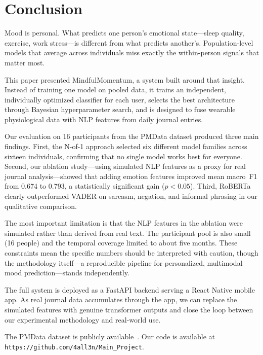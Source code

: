 \documentclass[conference]{IEEEtran}
\begin{document}
\section{Conclusion}
\label{sec:conclusion}

Mood is personal. What predicts one person's emotional state---sleep quality, exercise, work stress---is different from what predicts another's. Population-level models that average across individuals miss exactly the within-person signals that matter most.

This paper presented MindfulMomentum, a system built around that insight. Instead of training one model on pooled data, it trains an independent, individually optimized classifier for each user, selects the best architecture through Bayesian hyperparameter search, and is designed to fuse wearable physiological data with NLP features from daily journal entries.

Our evaluation on 16 participants from the PMData dataset produced three main findings. First, the N-of-1 approach selected six different model families across sixteen individuals, confirming that no single model works best for everyone. Second, our ablation study---using simulated NLP features as a proxy for real journal analysis---showed that adding emotion features improved mean macro~F1 from 0.674 to 0.793, a statistically significant gain ($p < 0.05$). Third, RoBERTa clearly outperformed VADER on sarcasm, negation, and informal phrasing in our qualitative comparison.

The most important limitation is that the NLP features in the ablation were simulated rather than derived from real text. The participant pool is also small (16 people) and the temporal coverage limited to about five months. These constraints mean the specific numbers should be interpreted with caution, though the methodology itself---a reproducible pipeline for personalized, multimodal mood prediction---stands independently.

The full system is deployed as a FastAPI backend serving a React Native mobile app. As real journal data accumulates through the app, we can replace the simulated features with genuine transformer outputs and close the loop between our experimental methodology and real-world use.

The PMData dataset is publicly available~\cite{thambawita2020pmdata}. Our code is available at \texttt{https://github.com/4all3n/Main\_Project}.

\end{document}
